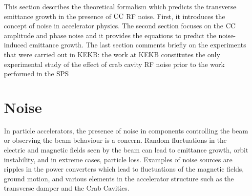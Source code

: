 This section describes the theoretical formalism which predicts the transverse emittance growth in the presence of ${\mathrm{CC}}$ RF noise. First, it introduces the concept of noise in accelerator physics. The second section focuses on the ${\mathrm{CC}}$ amplitude and phase noise and it provides the equations to predict the noise-induced emittance growth. The last section comments briefly on the experiments that were carried out in KEKB: the work at KEKB constitutes the only experimental study of the effect of crab cavity RF noise prior to the work performed in the SPS 



\section{Noise}\label{sec:noise_definition}
In particle accelerators, the presence of noise in components controlling the beam or observing the beam behaviour is a concern. Random fluctuations in the electric and magnetic fields seen by the beam can lead to emittance growth, orbit instability, and in extreme cases, particle loss. Examples of noise sources are ripples in the power converters which lead to fluctuations of the magnetic fields, ground motion, and various elements in the accelerator structure such as the transverse damper and the Crab Cavities. %

